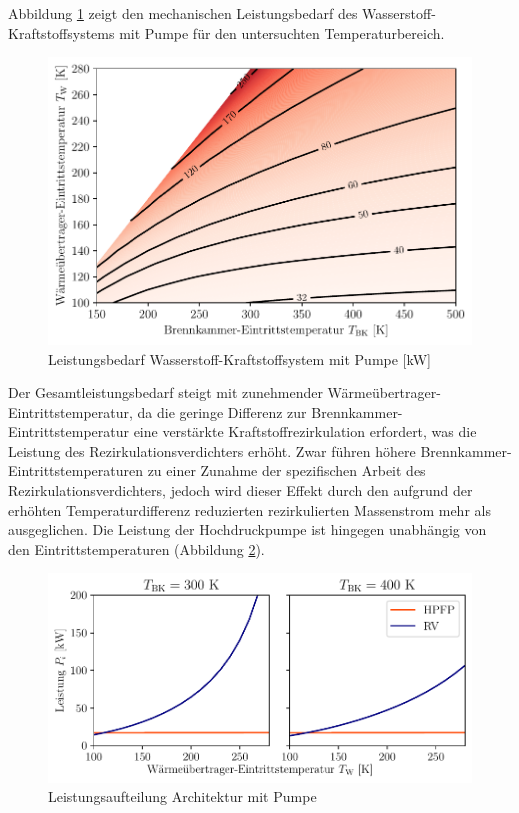 Abbildung \ref{fig:pumppower} zeigt den mechanischen Leistungsbedarf des Wasserstoff-Kraftstoffsystems mit Pumpe für den untersuchten Temperaturbereich. 

\begin{figure}[ht]
\centering
\includegraphics[width=0.9\linewidth]{4_Abbildungen/2_Hauptteil/Ergebnisse/Pumpepowercontour.pdf}
  \caption{Leistungsbedarf Wasserstoff-Kraftstoffsystem mit Pumpe [kW]}
  \label{fig:pumppower}
\end{figure}
\FloatBarrier

Der Gesamtleistungsbedarf steigt mit zunehmender Wärmeübertrager-Eintrittstemperatur, da die geringe Differenz zur Brennkammer-Eintrittstemperatur eine verstärkte Kraftstoffrezirkulation erfordert, was die Leistung des Rezirkulationsverdichters erhöht. Zwar führen höhere Brennkammer-Eintrittstemperaturen zu einer Zunahme der spezifischen Arbeit des Rezirkulationsverdichters, jedoch wird dieser Effekt durch den aufgrund der erhöhten Temperaturdifferenz reduzierten rezirkulierten Massenstrom mehr als ausgeglichen. Die Leistung der Hochdruckpumpe ist hingegen unabhängig von den Eintrittstemperaturen (Abbildung \ref{fig:pumpsplit}). 

\begin{figure}[ht]
\centering
\includegraphics[width=0.9\linewidth]{4_Abbildungen/2_Hauptteil/Ergebnisse/Pumpe_powersplit.pdf}
  \caption{Leistungsaufteilung Architektur mit Pumpe}
  \label{fig:pumpsplit}
\end{figure}
\FloatBarrier

